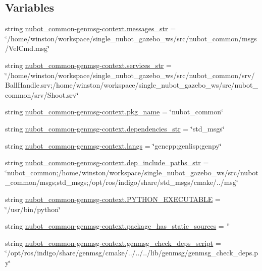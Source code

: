 \subsection*{Variables}
\begin{DoxyCompactItemize}
\item 
string \hyperlink{namespacenubot__common-genmsg-context_a9d82d20e4ffa677c598751d6630dc734}{nubot\-\_\-common-\/genmsg-\/context.\-messages\-\_\-str} = \char`\"{}/home/winston/workspace/single\-\_\-nubot\-\_\-gazebo\-\_\-ws/src/nubot\-\_\-common/msgs/Vel\-Cmd.\-msg\char`\"{}
\item 
string \hyperlink{namespacenubot__common-genmsg-context_a1e2a824c1778c805a4593863a72ba35e}{nubot\-\_\-common-\/genmsg-\/context.\-services\-\_\-str} = \char`\"{}/home/winston/workspace/single\-\_\-nubot\-\_\-gazebo\-\_\-ws/src/nubot\-\_\-common/srv/Ball\-Handle.\-srv;/home/winston/workspace/single\-\_\-nubot\-\_\-gazebo\-\_\-ws/src/nubot\-\_\-common/srv/Shoot.\-srv\char`\"{}
\item 
string \hyperlink{namespacenubot__common-genmsg-context_aa7e82af182943505146665259b8e1ce9}{nubot\-\_\-common-\/genmsg-\/context.\-pkg\-\_\-name} = \char`\"{}nubot\-\_\-common\char`\"{}
\item 
string \hyperlink{namespacenubot__common-genmsg-context_acb3057b57eb9458421378baa13f383d0}{nubot\-\_\-common-\/genmsg-\/context.\-dependencies\-\_\-str} = \char`\"{}std\-\_\-msgs\char`\"{}
\item 
string \hyperlink{namespacenubot__common-genmsg-context_ad47fe39b5ca574c609a0a44451d67ebe}{nubot\-\_\-common-\/genmsg-\/context.\-langs} = \char`\"{}gencpp;genlisp;genpy\char`\"{}
\item 
string \hyperlink{namespacenubot__common-genmsg-context_a3cb8468ce84e82ac5e2b66290f260f4c}{nubot\-\_\-common-\/genmsg-\/context.\-dep\-\_\-include\-\_\-paths\-\_\-str} = \char`\"{}nubot\-\_\-common;/home/winston/workspace/single\-\_\-nubot\-\_\-gazebo\-\_\-ws/src/nubot\-\_\-common/msgs;std\-\_\-msgs;/opt/ros/indigo/share/std\-\_\-msgs/cmake/../msg\char`\"{}
\item 
string \hyperlink{namespacenubot__common-genmsg-context_a07f30a33447f3b83a20605f1732e2763}{nubot\-\_\-common-\/genmsg-\/context.\-P\-Y\-T\-H\-O\-N\-\_\-\-E\-X\-E\-C\-U\-T\-A\-B\-L\-E} = \char`\"{}/usr/bin/python\char`\"{}
\item 
string \hyperlink{namespacenubot__common-genmsg-context_a9b23bed4614ce829e09eb98736bbcfb6}{nubot\-\_\-common-\/genmsg-\/context.\-package\-\_\-has\-\_\-static\-\_\-sources} = ''
\item 
string \hyperlink{namespacenubot__common-genmsg-context_a32a0523eb31dd66d816b3d32bd6aa2b5}{nubot\-\_\-common-\/genmsg-\/context.\-genmsg\-\_\-check\-\_\-deps\-\_\-script} = \char`\"{}/opt/ros/indigo/share/genmsg/cmake/../../../lib/genmsg/genmsg\-\_\-check\-\_\-deps.\-py\char`\"{}
\end{DoxyCompactItemize}
